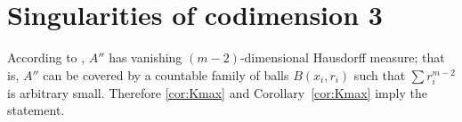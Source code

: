 \section{Singularities of codimension 3}\label{sec:codmi=3}


According to \cite[10.6]{BGP}, $A''$ has vanishing $(m-2)$-dimensional Hausdorff measure;
that is, $A''$ can be covered by a countable family of balls $B(x_i,r_i)$ such that $\sum r_i^{m-2}$ is arbitrary small.
Therefore \ref{cor:Kmax} and Corollary~\ref{cor:Kmax} imply the statement.
\qeds
